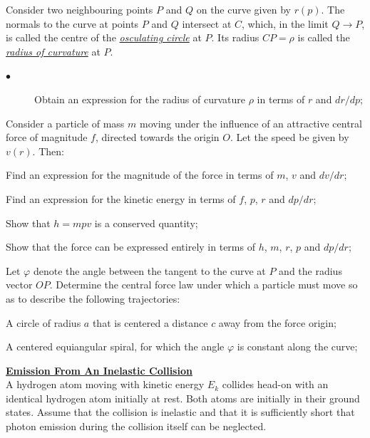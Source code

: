 \documentclass[a4paper]{article}
\begin{document}
	Consider two neighbouring points $P$ and $Q$ on the curve given by $r(p)$. The normals to the curve at points $P$ and $Q$ intersect at $C$, which, in the limit $Q \rightarrow P$, is called the centre of the \underline{\emph{osculating circle}} at $P$. Its radius $CP = \rho$ is called the \underline{\emph{radius of curvature}} at $P$. 
	\begin{description}
		\item[$\bullet$] Obtain an expression for the radius of curvature $\rho$ in terms of $r$ and $dr/dp$;
	\end{description}
	Consider a particle of mass $m$ moving under the influence of an attractive central force of magnitude $f$, directed towards the origin $O$. Let the speed be given by $v(r)$. Then:
	\begin{description}[leftmargin=!, labelwidth=\widthof{$\bullet$}]
		\item[$\bullet$] Find an expression for the magnitude of the force in terms of $m$, $v$ and $dv/dr$;
		\item[$\bullet$] Find an expression for the kinetic energy in terms of $f$, $p$, $r$ and $dp/dr$;
		\item[$\bullet$] Show that $h = mpv$ is a conserved quantity;
		\item[$\bullet$] Show that the force can be expressed entirely in terms of $h$, $m$, $r$, $p$ and $dp/dr$;
	\end{description}
	Let $\varphi$ denote the angle between the tangent to the curve at $P$ and the radius vector $OP$. Determine the central force law under which a particle must move so as to describe the following trajectories:
	\begin{description}[leftmargin=!, labelwidth=\widthof{$\bullet$}]
		\item[$\bullet$] A circle of radius $a$ that is centered a distance $c$ away from the force origin;
		\item[$\bullet$] A centered equiangular spiral, for which the angle $\varphi$ is constant along the curve;
	\end{description}
	
	\vspace{-1em}
	
	
	\Problem
	\textbf{\underline{Emission From An Inelastic Collision}}
	\\
	A hydrogen atom moving with kinetic energy $E_k$ collides head-on with an identical hydrogen atom initially at rest. Both atoms are initially in their ground states. Assume that the collision is inelastic and that it is sufficiently short that photon emission during the collision itself can be neglected.
	
\end{document}
